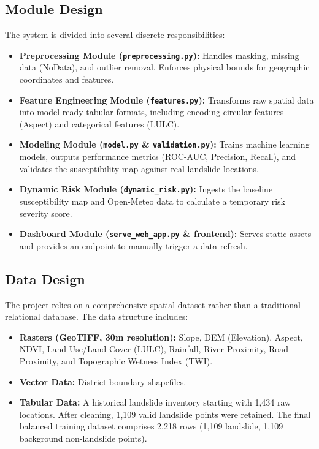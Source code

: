 \subsection{Module Design}
The system is divided into several discrete responsibilities:
\begin{itemize}
    \item \textbf{Preprocessing Module (\texttt{preprocessing.py}):} Handles masking, missing data (NoData), and outlier removal. Enforces physical bounds for geographic coordinates and features.
    \item \textbf{Feature Engineering Module (\texttt{features.py}):} Transforms raw spatial data into model-ready tabular formats, including encoding circular features (Aspect) and categorical features (LULC).
    \item \textbf{Modeling Module (\texttt{model.py} \& \texttt{validation.py}):} Trains machine learning models, outputs performance metrics (ROC-AUC, Precision, Recall), and validates the susceptibility map against real landslide locations.
    \item \textbf{Dynamic Risk Module (\texttt{dynamic\_risk.py}):} Ingests the baseline susceptibility map and Open-Meteo data to calculate a temporary risk severity score.
    \item \textbf{Dashboard Module (\texttt{serve\_web\_app.py} \& frontend):} Serves static assets and provides an endpoint to manually trigger a data refresh.
\end{itemize}

\subsection{Data Design}
The project relies on a comprehensive spatial dataset rather than a traditional relational database. The data structure includes:
\begin{itemize}
    \item \textbf{Rasters (GeoTIFF, 30m resolution):} Slope, DEM (Elevation), Aspect, NDVI, Land Use/Land Cover (LULC), Rainfall, River Proximity, Road Proximity, and Topographic Wetness Index (TWI).
    \item \textbf{Vector Data:} District boundary shapefiles.
    \item \textbf{Tabular Data:} A historical landslide inventory starting with 1,434 raw locations. After cleaning, 1,109 valid landslide points were retained. The final balanced training dataset comprises 2,218 rows (1,109 landslide, 1,109 background non-landslide points).
\end{itemize}

